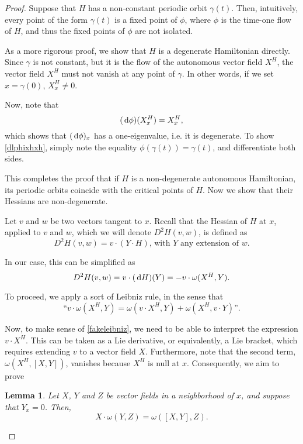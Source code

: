 \documentclass{article}
\newtheorem{lemma}{Lemma}
\theoremstyle{nonumberplain}
\newtheorem{proof}{Proof}
\begin{document}
\begin{proof}
Suppose that $H$ has a non-constant periodic orbit $\gamma(t)$. Then, intuitively, every point of the form $\gamma(t)$ is a fixed point of $\phi$, where $\phi$ is the time-one flow of $H$, and thus the fixed points of $\phi$ are not isolated.

As a more rigorous proof, we show that $H$ is a degenerate Hamiltonian directly. Since $\gamma$ is not constant, but it is the flow of the autonomous vector field $X^H$, the vector field $X^H$ must not vanish at any point of $\gamma$. In other words, if we set $x = \gamma(0)$, $X^H_x \neq 0$.

Now, note that
\begin{equation}\label{dlphixhxh}
(\dl \phi)(X^H_x) = X^H_x,
\end{equation}
which shows that $(\dl \phi)_x$ has a one-eigenvalue, i.e. it is degenerate. To show \eqref{dlphixhxh}, simply note the equality $\phi(\gamma(t)) = \gamma(t)$, and differentiate both sides.

This completes the proof that if $H$ is a non-degenerate autonomous Hamiltonian, its periodic orbits coincide with the critical points of $H$. Now we show that their Hessians are non-degenerate.

Let $v$ and $w$ be two vectors tangent to $x$. Recall that the Hessian of $H$ at $x$, applied to $v$ and $w$, which we will denote $D^2 H(v,w)$, is defined as
\begin{equation}
D^2 H(v,w) = v \cdot (Y \cdot H) \text{, with $Y$ any extension of $w$.}
\end{equation}

In our case, this can be simplified as
\begin{equation}\label{hessian1}
D^2 H(v,w) = v \cdot (\dl H)(Y) = - v \cdot \omega(X^H, Y).
\end{equation}

To proceed, we apply a sort of Leibniz rule, in the sense that
\begin{equation}\label{fakeleibniz}
\text{``$v \cdot \omega(X^H, Y) = \omega(v \cdot X^H, Y) + \omega(X^H, v \cdot Y)$''.}
\end{equation}

Now, to make sense of \eqref{fakeleibniz}, we need to be able to interpret the expression $v \cdot X^H$. This can be taken as a Lie derivative, or equivalently, a Lie bracket, which requires extending $v$ to a vector field $X$. Furthermore, note that the second term, $\omega(X^H, [X,Y])$, vanishes because $X^H$ is null at $x$. Consequently, we aim to prove
\begin{lemma}\label{leibniz1}
Let $X$, $Y$ and $Z$ be vector fields in a neighborhood of $x$, and suppose that $Y_x = 0$. Then,
\begin{equation}
X \cdot \omega(Y,Z) = \omega([X,Y],Z).
\end{equation}
\end{lemma}


\end{proof}
\end{document}
